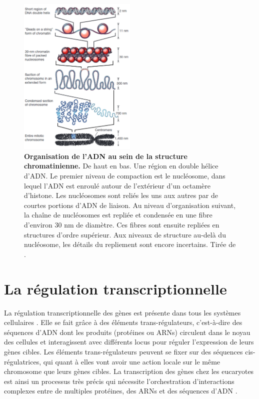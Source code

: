 \begin{figure}[h]
    \centering
    \includegraphics[width=0.5\textwidth, page=1] {figures/introduction/fig4.png}
    \caption[Organisation de l'\acrshort{ADN} au sein de la structure chromatinienne.]{
    \textbf{Organisation de l'\acrshort{ADN} au sein de la structure chromatinienne.}
     De haut en bas. Une région en double hélice d'\acrshort{ADN}. Le premier niveau de compaction est le nucléosome, dans lequel l'\acrshort{ADN} est enroulé autour de l'extérieur d'un octamère d'histone. Les nucléosomes sont reliés les uns aux autres par de courtes portions d'\acrshort{ADN} de liaison. Au niveau d'organisation suivant, la chaîne de nucléosomes est repliée et condensée en une fibre d'environ 30 nm de diamètre. Ces fibres sont ensuite repliées en structures d'ordre supérieur. Aux niveaux de structure au-delà du nucléosome, les détails du repliement sont encore incertains. Tirée de \citep{felsenfeld_controlling_2003}. \\
    }
    \label{fig:Fig4}
\end{figure} 

\section{La régulation transcriptionnelle}
\label{sec:reg-transcription}

La régulation transcriptionnelle des gènes est présente dans tous les systèmes cellulaires \citep{ptashne_regulation_2005}. Elle se fait grâce à des éléments \gls{trans}-régulateurs, c'est-à-dire des séquences d’ADN dont les produits (protéines ou \acrshort{ARN}s) circulent dans le noyau des cellules et interagissent avec différents locus pour réguler l’expression de leurs gènes cibles. Les éléments \gls{trans}-régulateurs peuvent se fixer sur des séquences \gls{cis}-régulatrices, qui quant à elles vont avoir une action locale sur le même chromosome que leurs gènes cibles. La transcription des gènes chez les eucaryotes est ainsi un processus très précis qui nécessite l’orchestration d’interactions complexes entre de multiples protéines, des \acrshort{ARN}s et des séquences d’ADN \citep{maston_transcriptional_2006,ong_enhancer_2011}.

